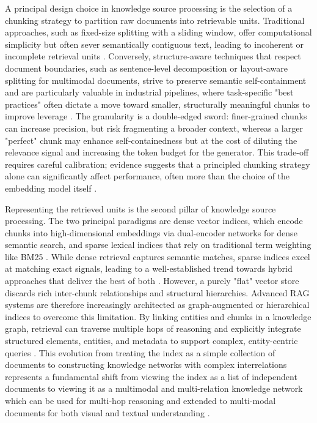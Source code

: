 \documentclass[11pt,a4paper]{article}
\begin{document}
A principal design choice in knowledge source processing is the selection of a chunking strategy to partition raw documents into retrievable units. Traditional approaches, such as fixed-size splitting with a sliding window, offer computational simplicity but often sever semantically contiguous text, leading to incoherent or incomplete retrieval units \cite{arxiv:2407.01219v1}. Conversely, structure-aware techniques that respect document boundaries, such as sentence-level decomposition or layout-aware splitting for multimodal documents, strive to preserve semantic self-containment and are particularly valuable in industrial pipelines, where task-specific "best practices" often dictate a move toward smaller, structurally meaningful chunks to improve leverage \cite{arxiv:2602.03368v2}. The granularity is a double-edged sword: finer-grained chunks can increase precision, but risk fragmenting a broader context, whereas a larger "perfect" chunk may enhance self-containedness but at the cost of diluting the relevance signal and increasing the token budget for the generator. This trade-off requires careful calibration; evidence suggests that a principled chunking strategy alone can significantly affect performance, often more than the choice of the embedding model itself \cite{arxiv:2407.01219v1}.

Representing the retrieved units is the second pillar of knowledge source processing. The two principal paradigms are dense vector indices, which encode chunks into high-dimensional embeddings via dual-encoder networks for dense semantic search, and sparse lexical indices that rely on traditional term weighting like BM25 \cite{arxiv:2009.08553v4}. While dense retrieval captures semantic matches, sparse indices excel at matching exact signals, leading to a well-established trend towards hybrid approaches that deliver the best of both \cite{arxiv:2503.23013v1}. However, a purely "flat" vector store discards rich inter-chunk relationships and structural hierarchies. Advanced RAG systems are therefore increasingly architected as graph-augmented or hierarchical indices to overcome this limitation. By linking entities and chunks in a knowledge graph, retrieval can traverse multiple hops of reasoning and explicitly integrate structured elements, entities, and metadata to support complex, entity-centric queries \cite{arxiv:2410.05779v3}. This evolution from treating the index as a simple collection of documents to constructing knowledge networks with complex interrelations represents a fundamental shift from viewing the index as a list of independent documents to viewing it as a multimodal and multi-relation knowledge network which can be used for multi-hop reasoning and extended to multi-modal documents for both visual and textual understanding \cite{arxiv:2503.18016v1,arxiv:2504.08748v1}.
\end{document}
